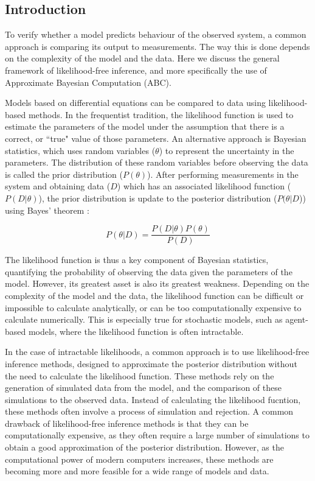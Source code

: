 \subsection{Introduction}
To verify whether a model predicts behaviour of the observed system, a common
approach is comparing its output to measurements. The way this is done depends
on the complexity of the model and the data. Here we discuss the general
framework of likelihood-free inference, and more specifically the use of
Approximate Bayesian Computation (ABC). \par Models based on differential
equations can be compared to data using likelihood-based methods. In the
frequentist tradition, the likelihood function is used to estimate the
parameters of the model under the assumption that there is a correct, or
``true" value of those parameters. An alternative approach is Bayesian
statistics, which uses random variables ($\theta$) to represent the uncertainty
in the parameters. The distribution of these random variables before observing
the data is called the prior distribution ($P(\theta)$). After performing
measurements in the system and obtaining data ($D$) which has an associated
likelihood function ($P(D|\theta)$), the prior distribution is update to the
posterior distribution ($P(\theta|D$)) using Bayes' theorem
\cite{bayes_essay_1763}:

\begin{equation}
    P(\theta|D) = \frac{P(D|\theta)P(\theta)}{P(D)}
\end{equation}

The likelihood function is thus a key component of Bayesian statistics,
quantifying the probability of observing the data given the parameters of the
model. However, its greatest asset is also its greatest weakness. Depending on
the complexity of the model and the data, the likelihood function can be
difficult or impossible to calculate analytically, or can be too
computationally expensive to calculate numerically. This is especially true for
stochastic models, such as agent-based models, where the likelihood function is
often intractable. \par In the case of intractable likelihoods, a common
approach is to use likelihood-free inference methods, designed to approximate
the posterior distribution without the need to calculate the likelihood
function. These methods rely on the generation of simulated data from the
model, and the comparison of these simulations to the observed data. Instead of
calculating the likelihood fucntion, these methods often involve a process of
simulation and rejection. A common drawback of likelihood-free inference
methods is that they can be computationally expensive, as they often require a
large number of simulations to obtain a good approximation of the posterior
distribution. However, as the computational power of modern computers
increases, these methods are becoming more and more feasible for a wide range
of models and data.

